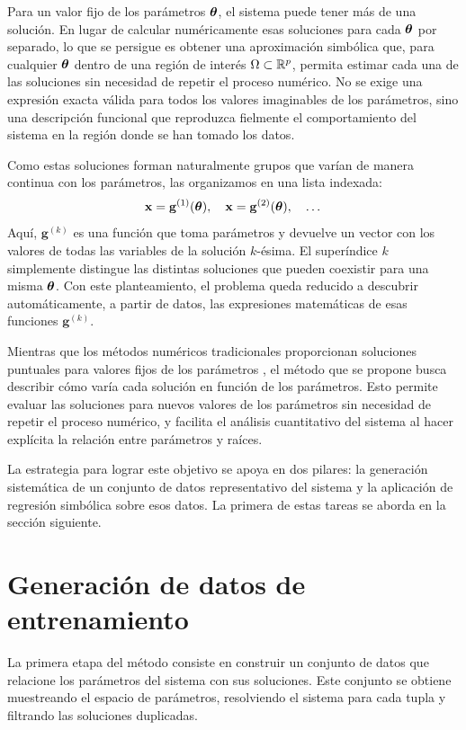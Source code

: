 Para un valor fijo de los parámetros \(\boldsymbol{\theta}\), el sistema puede tener más de una solución. En lugar de calcular numéricamente esas soluciones para cada \(\boldsymbol{\theta}\) por separado, lo que se persigue es obtener una aproximación simbólica que, para cualquier \(\boldsymbol{\theta}\) dentro de una región de interés \(\Omega \subset \mathbb{R}^p\), permita estimar cada una de las soluciones sin necesidad de repetir el proceso numérico. No se exige una expresión exacta válida para todos los valores imaginables de los parámetros, sino una descripción funcional que reproduzca fielmente el comportamiento del sistema en la región donde se han tomado los datos.

Como estas soluciones forman naturalmente grupos que varían de manera continua con los parámetros, las organizamos en una lista indexada: \[ \mathbf{x} = \mathbf{g}^{(1)}(\boldsymbol{\theta}),\quad \mathbf{x} = \mathbf{g}^{(2)}(\boldsymbol{\theta}),\quad \dots \] Aquí, \(\mathbf{g}^{(k)}\) es una función que toma parámetros y devuelve un vector con los valores de todas las variables de la solución \(k\)-ésima. El superíndice \(k\) simplemente distingue las distintas soluciones que pueden coexistir para una misma \(\boldsymbol{\theta}\). Con este planteamiento, el problema queda reducido a descubrir automáticamente, a partir de datos, las expresiones matemáticas de esas funciones \(\mathbf{g}^{(k)}\).

Mientras que los métodos numéricos tradicionales proporcionan soluciones puntuales para valores fijos de los parámetros \cite{burden2010numerical}, el método que se propone busca describir cómo varía cada solución en función de los parámetros. Esto permite evaluar las soluciones para nuevos valores de los parámetros sin necesidad de repetir el proceso numérico, y facilita el análisis cuantitativo del sistema al hacer explícita la relación entre parámetros y raíces.

La estrategia para lograr este objetivo se apoya en dos pilares: la generación sistemática de un conjunto de datos representativo del sistema y la aplicación de regresión simbólica sobre esos datos. La primera de estas tareas se aborda en la sección siguiente.

\section{Generación de datos de entrenamiento} \label{sec:generacion_datos}

La primera etapa del método consiste en construir un conjunto de datos que relacione los parámetros del sistema con sus soluciones. Este conjunto se obtiene muestreando el espacio de parámetros, resolviendo el sistema para cada tupla y filtrando las soluciones duplicadas.

